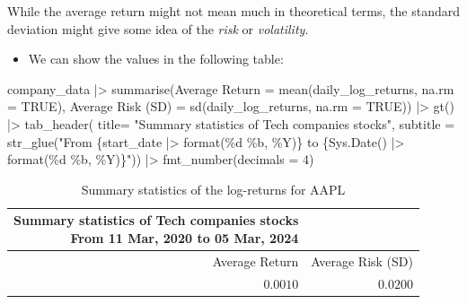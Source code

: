 \documentclass[
  letterpaper,
  DIV=11,
  numbers=noendperiod]{scrreprt}
\newenvironment{Shaded}{\begin{snugshade}}{\end{snugshade}}
\newcommand{\AttributeTok}[1]{\textcolor[rgb]{0.40,0.45,0.13}{#1}}
\newcommand{\ConstantTok}[1]{\textcolor[rgb]{0.56,0.35,0.01}{#1}}
\newcommand{\DecValTok}[1]{\textcolor[rgb]{0.68,0.00,0.00}{#1}}
\newcommand{\FunctionTok}[1]{\textcolor[rgb]{0.28,0.35,0.67}{#1}}
\newcommand{\NormalTok}[1]{\textcolor[rgb]{0.00,0.23,0.31}{#1}}
\newcommand{\OtherTok}[1]{\textcolor[rgb]{0.00,0.23,0.31}{#1}}
\newcommand{\SpecialCharTok}[1]{\textcolor[rgb]{0.37,0.37,0.37}{#1}}
\newcommand{\StringTok}[1]{\textcolor[rgb]{0.13,0.47,0.30}{#1}}
\providecommand{\tightlist}{%
  \setlength{\itemsep}{0pt}\setlength{\parskip}{0pt}}\usepackage{longtable,booktabs,array}
\theoremstyle{definition}
\theoremstyle{remark}
\begin{document}
\begin{tcolorbox}[enhanced jigsaw, leftrule=.75mm, toprule=.15mm, arc=.35mm, colbacktitle=quarto-callout-caution-color!10!white, opacityback=0, title=\textcolor{quarto-callout-caution-color}{\faFire}\hspace{0.5em}{A word of warning}, breakable, bottomrule=.15mm, bottomtitle=1mm, colframe=quarto-callout-caution-color-frame, colback=white, toptitle=1mm, left=2mm, titlerule=0mm, rightrule=.15mm, opacitybacktitle=0.6, coltitle=black]

While the average return might not mean much in theoretical terms, the
standard deviation might give some idea of the \emph{risk} or
\emph{volatility}.

\end{tcolorbox}

\begin{itemize}
\tightlist
\item
  We can show the values in the following table:
\end{itemize}

\begin{Shaded}
\begin{Highlighting}[]
\NormalTok{company\_data }\SpecialCharTok{|\textgreater{}} 
  \FunctionTok{summarise}\NormalTok{(}\StringTok{\textasciigrave{}}\AttributeTok{Average Return}\StringTok{\textasciigrave{}} \OtherTok{=} \FunctionTok{mean}\NormalTok{(daily\_log\_returns, }\AttributeTok{na.rm =} \ConstantTok{TRUE}\NormalTok{), }
            \StringTok{\textasciigrave{}}\AttributeTok{Average Risk (SD)}\StringTok{\textasciigrave{}} \OtherTok{=} \FunctionTok{sd}\NormalTok{(daily\_log\_returns, }\AttributeTok{na.rm =} \ConstantTok{TRUE}\NormalTok{)) }\SpecialCharTok{|\textgreater{}} 
  \FunctionTok{gt}\NormalTok{() }\SpecialCharTok{|\textgreater{}} 
  \FunctionTok{tab\_header}\NormalTok{(}
    \AttributeTok{title=} \StringTok{"Summary statistics of Tech companies stocks"}\NormalTok{,}
    \AttributeTok{subtitle  =} \FunctionTok{str\_glue}\NormalTok{(}\StringTok{"From \{start\_date |\textgreater{} format(\textquotesingle{}\%d \%b, \%Y\textquotesingle{})\} to \{Sys.Date() |\textgreater{} format(\textquotesingle{}\%d \%b, \%Y\textquotesingle{})\}"}\NormalTok{)) }\SpecialCharTok{|\textgreater{}} 
  \FunctionTok{fmt\_number}\NormalTok{(}\AttributeTok{decimals  =} \DecValTok{4}\NormalTok{)}
\end{Highlighting}
\end{Shaded}

\begin{longtable}{rr}

\caption{\label{tbl-summary-aapl}Summary statistics of the log-returns
for AAPL}

\tabularnewline

\caption*{
{\large Summary statistics of Tech companies stocks} \\ 
{\small From 11 Mar, 2020 to 05 Mar, 2024}
} \\ 
\toprule
Average Return & Average Risk (SD) \\ 
\midrule\addlinespace[2.5pt]
$0.0010$ & $0.0200$ \\ 
\bottomrule

\end{longtable}
\end{document}
